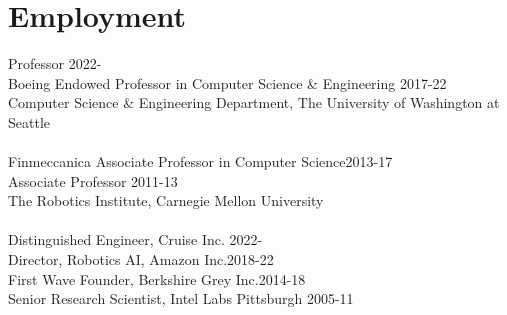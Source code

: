 
\section{Employment}
\noindent
Professor \hfill 2022-\phantom{20}\\
Boeing Endowed Professor in Computer Science \& Engineering \hfill 2017-22\\
Computer Science \& Engineering Department, 
The University of Washington at Seattle\\
\\
Finmeccanica Associate Professor in Computer Science\hfill 2013-17\\
Associate Professor \hfill 2011-13\\
The Robotics Institute,  Carnegie Mellon University\\
\\
Distinguished Engineer, Cruise Inc. \hfill 2022-\phantom{20}\\
Director, Robotics AI, Amazon Inc.\hfill 2018-22\\
First Wave Founder, Berkshire Grey Inc.\hfill 2014-18\\
Senior Research Scientist, Intel Labs Pittsburgh \hfill 2005-11

